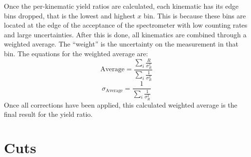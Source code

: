 Once the per-kinematic yield ratios are calculated, each kinematic has its edge bins dropped, that is the lowest and highest $x$ bin. This is because these bins are located at the edge of the acceptance of the spectrometer with low counting rates and large uncertainties. After this is done, all kinematics are combined through a weighted average. The ``weight'' is the uncertainty on the measurement in that bin. The equations for the weighted average are:
\begin{equation}
	\text{Average} = \frac{\sum\limits_{i} \frac{R}{\sigma^2_R}}{\sum\limits_{i} \frac{1}{\sigma^2_R}}
\end{equation}
\begin{equation}
	\sigma_\text{Average} = \frac{1}{\sum\limits_{i} \frac{1}{\sigma^2_R}}
\end{equation}
Once all corrections have been applied, this calculated weighted average is the final result for the yield ratio.

%

\section{Cuts}





